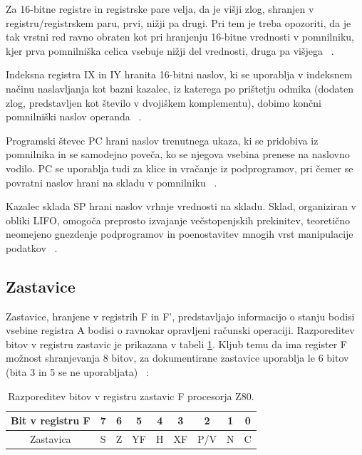\documentclass[a4paper, 12pt, openright]{book}
\begin{document}
    Za 16-bitne registre in registrske pare velja, da je višji zlog, shranjen v registru/registrskem
    paru, prvi, nižji pa drugi. Pri tem je treba opozoriti, da je tak vrstni red ravno
    obraten kot pri hranjenju 16-bitne vrednosti v pomnilniku, kjer prva
    pomnilniška celica vsebuje nižji del vrednosti, druga pa višjega ~\cite{strojnijezikzaprocesorz80,
    z80cpuusermanual}.

    Indeksna registra IX in IY hranita 16-bitni naslov, ki se uporablja v indeksnem
    načinu naslavljanja kot bazni kazalec, iz katerega po prištetju odmika (dodaten
    zlog, predstavljen kot število v dvojiškem komplementu), dobimo končni
    pomnilniški naslov operanda ~\cite{z80cpuusermanual}.

    Programski števec PC hrani naslov trenutnega ukaza, ki se pridobiva iz
    pomnilnika in se samodejno poveča, ko se njegova vsebina prenese na naslovno vodilo.
    PC se uporablja tudi za klice in vračanje iz podprogramov, pri čemer se povratni
    naslov hrani na skladu v pomnilniku ~\cite{strojnijezikzaprocesorz80, z80cpuusermanual}.

    Kazalec sklada SP hrani naslov vrhnje vrednosti na skladu. Sklad,
    organiziran v obliki LIFO, omogoča preprosto izvajanje večstopenjskih prekinitev,
    teoretično neomejeno gnezdenje podprogramov in poenostavitev mnogih vrst
    manipulacije podatkov ~\cite{strojnijezikzaprocesorz80, z80cpuusermanual}.

    \subsection{Zastavice}

    Zastavice, hranjene v registrih F in F', predstavljajo informacijo o stanju bodisi
    vsebine registra A bodisi o ravnokar opravljeni računski operaciji.
    Razporeditev bitov v registru zastavic je prikazana v tabeli
    \ref{z80cpuusermanual_tab1}. Kljub temu da ima register F možnost shranjevanja
    8 bitov, za dokumentirane zastavice uporablja le 6 bitov (bita 3 in 5 se ne uporabljata)
    ~\cite{strojnijezikzaprocesorz80, z80cpuusermanual}:

    \begin{table}[htb]
        \begin{center}
            \begin{tabular}{|c|c|c|c|c|c|c|c|c|}
                \hline
                Bit v registru F & 7 & 6 & 5  & 4 & 3  & 2   & 1 & 0 \\
                \hline
                Zastavica        & S & Z & YF & H & XF & P/V & N & C \\
                \hline
            \end{tabular}
        \end{center}
        \caption{Razporeditev bitov v registru zastavic F procesorja Z80.}
        \label{z80cpuusermanual_tab1}
    \end{table}
\end{document}

